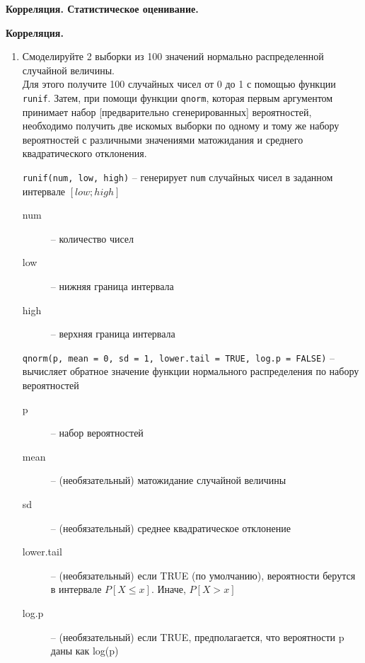 
\textbf{\large Корреляция. Статистическое оценивание.}

\textbf{Корреляция.}

\begin{enumerate}

    \item Смоделируйте 2 выборки из 100 значений нормально распределенной случайной величины. \\
          Для этого получите 100 случайных чисел от 0 до 1 с помощью функции \texttt{runif}.
          Затем, при помощи функции \texttt{qnorm}, которая первым аргументом принимает 
          набор [предварительно сгенерированных] вероятностей, необходимо получить две искомых выборки
          по одному и тому же набору вероятностей с различными значениями матожидания и среднего 
          квадратического отклонения.

          \begin{mdframed}[style=BadassFrame]

              \texttt{runif(num, low, high)} -- генерирует \texttt{num} случайных чисел в заданном интервале $[low; high]$  
              \begin{description}

                \item[num] -- количество чисел
                \item[low] -- нижняя граница интервала
                \item[high] -- верхняя граница интервала
              \end{description}
          \end{mdframed}

          \begin{mdframed}[style=BadassFrame]

              \texttt{qnorm(p, mean = 0, sd = 1, lower.tail = TRUE, log.p = FALSE)} 
                -- вычисляет обратное значение функции нормального распределения по набору вероятностей
              \begin{description}

                \item[p] -- набор вероятностей
                \item[mean] -- (необязательный) матожидание случайной величины
                \item[sd] -- (необязательный) среднее квадратическое отклонение
                \item[lower.tail] -- (необязательный) если TRUE (по умолчанию), вероятности берутся в интервале $P[X \leq x]$. Иначе, $P[X > x]$ 
                \item[log.p] -- (необязательный) если TRUE, предполагается, что вероятности p даны как log(p)
              \end{description}
          \end{mdframed}


\end{enumerate}
